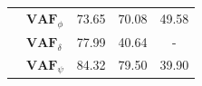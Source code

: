 \begin{table}[]
\begin{tabular}{llcccccc}
                                                   & $\mathbf{VAF}_\phi$                                    & \multicolumn{2}{c}{73.65}                                                                          & \multicolumn{2}{c}{70.08}                                                                          & \multicolumn{2}{c}{49.58}                                                                          \\
                                                   & $\mathbf{VAF}_\delta$                                  & \multicolumn{2}{c}{77.99}                                                                          & \multicolumn{2}{c}{40.64}                                                                          & \multicolumn{2}{c}{-}                                                                              \\
                                                   & $\mathbf{VAF}_\psi$                                    & \multicolumn{2}{c}{84.32}                                                                          & \multicolumn{2}{c}{79.50}                                                                          & \multicolumn{2}{c}{39.90}                                                                         
    \end{tabular}
    \end{table}

